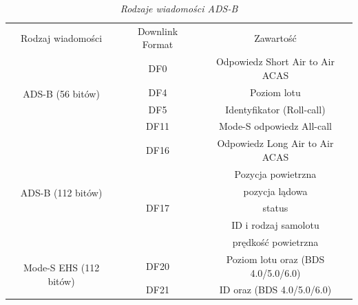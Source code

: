 \documentclass[eng,printmode]{mgr}
\begin{document}
\begin{table}[ph]
\caption{\textit{ Rodzaje wiadomości ADS-B}}
\label{tab:adsb}
  \centering
  \def\arraystretch{1.3}%
  \begin{tabular}{|c|c|c|}
  \hline
  \multicolumn{1}{|c|}{Rodzaj wiadomości} & \multicolumn{1}{c|}{Downlink Format} & \multicolumn{1}{c|}{Zawartość} \\\cline{1-3}
  \multirow{4}{*}{ADS-B (56 bitów)} 
  				 & \multicolumn{1}{c|}{DF0} & \multicolumn{1}{c|}{Odpowiedz Short Air to Air ACAS} \\\cline{2-3}
                 & \multicolumn{1}{c|}{DF4} & \multicolumn{1}{c|}{Poziom lotu} \\\cline{2-3}
                 & \multicolumn{1}{c|}{DF5} & \multicolumn{1}{c|}{Identyfikator (Roll-call)} \\\cline{2-3}
                 & \multicolumn{1}{c|}{DF11} & \multicolumn{1}{c|}{Mode-S odpowiedz All-call} \\\hline
  \multirow{6}{*}{ADS-B (112 bitów)} 
  				 & \multicolumn{1}{c|}{DF16} & \multicolumn{1}{c|}{Odpowiedz Long Air to Air ACAS} \\\cline{2-3}
                 & \multirow{5}{*}{DF17} & Pozycja powietrzna \\\hhline{~~~} 
                 &                       & pozycja lądowa \\\hhline{~~~} 
                 &                       & status \\\hhline{~~~} 
                 &                       & ID i rodzaj samolotu  \\\hhline{~~~} 
                 &                       & prędkość powietrzna \\\hline
 \multirow{2}{*}{Mode-S EHS (112 bitów)} 
	& \multicolumn{1}{c|}{DF20} & \multicolumn{1}{c|}{Poziom lotu oraz (BDS 4.0/5.0/6.0)} \\\cline{2-3}
	& \multicolumn{1}{c|}{DF21} & \multicolumn{1}{c|}{ID oraz (BDS 4.0/5.0/6.0)} \\\hline
 \end{tabular}
\end{table}
\newpage
\end{document}
